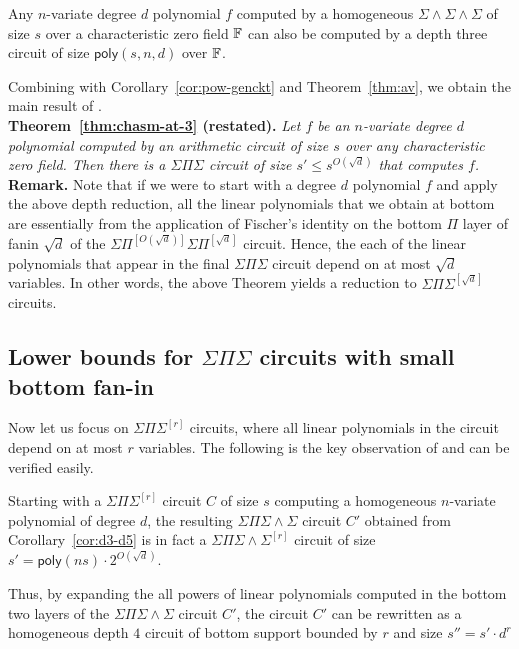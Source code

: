 \documentclass{beatcs}
\newcommand{\poly}{\mathsf{poly}}
\newcommand{\SPS}{\Sigma\Pi\Sigma}
\newcommand{\SPSPfanin}[2]{\Sigma\Pi^{[#1]}\Sigma\Pi^{[#2]}}
\newcommand{\SESES}{\Sigma\!\wedge\!\Sigma\!\wedge\!\Sigma}
\begin{document}
\begin{lemma}
Any $n$-variate degree $d$ polynomial $f$ computed by a homogeneous $\SESES$ of size $s$ over a characteristic zero field $\mathbb{F}$ can also be computed by a depth three circuit of size $\poly(s,n,d)$ over $\mathbb{F}$. 
\end{lemma}

Combining with Corollary~\ref{cor:pow-genckt} and Theorem~\ref{thm:av}, we obtain the main result of \cite{gkks13b}. \\

{\bf Theorem~\ref{thm:chasm-at-3} (restated). }{\em 
Let $f$ be an $n$-variate degree $d$ polynomial computed by an arithmetic circuit of size $s$ over any characteristic zero field. Then there is a $\SPS$ circuit of size $s' \leq s^{O(\sqrt{d})}$ that computes $f$. 
}\\

{\bf Remark. } Note that if we were to start with a degree $d$ polynomial $f$ and apply the above depth reduction, all the linear polynomials that we obtain at bottom are essentially from the application of Fischer's identity on the bottom $\Pi$ layer of fanin $\sqrt{d}$ of the $\SPSPfanin{O(\sqrt{d})}{\sqrt{d}}$ circuit. Hence, the each of the linear polynomials that appear in the final $\SPS$ circuit depend on at most $\sqrt{d}$ variables. In other words, the above Theorem yields a reduction to $\SPS^{[\sqrt{d}]}$ circuits. 

\subsection{Lower bounds for $\SPS$ circuits with small bottom fan-in}

Now let us focus on $\SPS^{[r]}$ circuits, where all linear polynomials in the circuit depend on at most $r$ variables. The following is the key observation of \cite{KayalSaha14} and can be verified easily. 

\begin{observation}
Starting with a $\SPS^{[r]}$ circuit $C$ of size $s$ computing a homogeneous $n$-variate polynomial of degree $d$, the resulting $\Sigma\Pi\Sigma\!\wedge\!\Sigma$ circuit $C'$ obtained from Corollary~\ref{cor:d3-d5} is in fact a 
$\Sigma\Pi\Sigma\!\wedge\!\Sigma^{[r]}$ circuit of size $s' = \poly(ns) \cdot 2^{O(\sqrt{d})}$. 

Thus, by expanding the all powers of linear polynomials computed in the bottom two layers of the $\Sigma\Pi\Sigma\!\wedge\!\Sigma$ circuit $C'$, the circuit $C'$ can be rewritten as a homogeneous depth $4$ circuit of bottom support bounded by $r$ and  size $s'' = s' \cdot d^r$
\end{observation}
\end{document}

